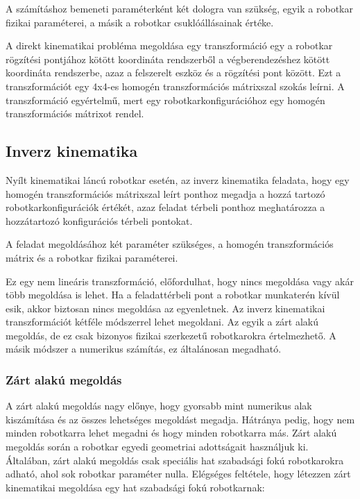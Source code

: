 A számításhoz bemeneti paraméterként két dologra van szükség, egyik a robotkar fizikai paraméterei, a másik a robotkar csuklóállásainak értéke.

A direkt kinematikai probléma megoldása egy transzformáció egy a robotkar rögzítési pontjához kötött koordináta rendszerből a végberendezéshez kötött koordináta rendszerbe, azaz a felszerelt eszköz és a rögzítési pont között. Ezt a transzformációt egy  4x4-es homogén transzformációs mátrixszal szokás leírni. A transzformáció egyértelmű, mert egy robotkarkonfigurációhoz egy homogén transzformációs mátrixot rendel. 

\cite{Siciliano:2007}

\subsection{Inverz kinematika}

Nyílt kinematikai láncú robotkar esetén, az inverz kinematika feladata, hogy egy
homogén transzformációs mátrixszal leírt ponthoz megadja a hozzá tartozó robotkarkonfigurációk értékét, azaz feladat térbeli ponthoz meghatározza a hozzátartozó konfigurációs térbeli pontokat.

A feladat megoldásához két paraméter szükséges, a homogén transzformációs mátrix és a robotkar fizikai paraméterei.

Ez egy nem lineáris transzformáció, előfordulhat, hogy nincs megoldása vagy akár több megoldása is lehet. Ha a feladattérbeli pont a robotkar munkaterén kívül esik, akkor biztosan nincs megoldása az egyenletnek. Az inverz kinematikai transzformációt kétféle módszerrel lehet megoldani. Az egyik a zárt alakú megoldás, de ez csak bizonyos fizikai szerkezetű robotkarokra értelmezhető. A másik módszer a numerikus számítás, ez általánosan megadható.


\subsubsection{Zárt alakú megoldás}

A zárt alakú megoldás nagy előnye, hogy gyorsabb mint numerikus alak kiszámítása és az összes lehetséges megoldást megadja. Hátránya pedig, hogy nem minden robotkarra lehet megadni és hogy minden robotkarra más. Zárt alakú megoldás során a robotkar egyedi geometriai adottságait használjuk ki. Általában, zárt alakú megoldás csak speciális hat szabadsági fokú robotkarokra adható, ahol sok robotkar paraméter nulla. Elégséges feltétele, hogy létezzen zárt kinematikai megoldása egy hat szabadsági fokú robotkarnak:

